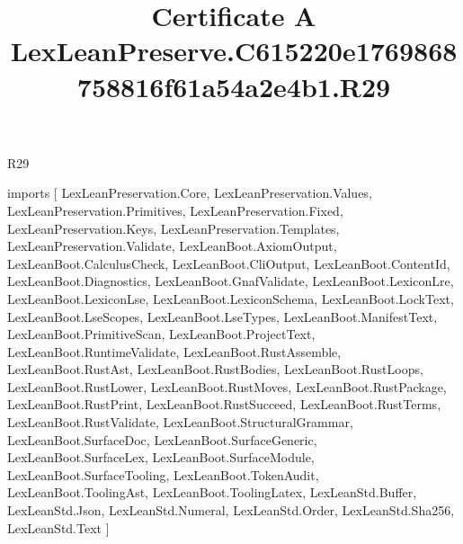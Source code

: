 \begin{lexlean}{R29}
\title{Certificate A LexLeanPreserve.C615220e1769868758816f61a54a2e4b1.R29}
\begin{coremodule}
imports [
  LexLeanPreservation.Core,
  LexLeanPreservation.Values,
  LexLeanPreservation.Primitives,
  LexLeanPreservation.Fixed,
  LexLeanPreservation.Keys,
  LexLeanPreservation.Templates,
  LexLeanPreservation.Validate,
  LexLeanBoot.AxiomOutput,
  LexLeanBoot.CalculusCheck,
  LexLeanBoot.CliOutput,
  LexLeanBoot.ContentId,
  LexLeanBoot.Diagnostics,
  LexLeanBoot.GnafValidate,
  LexLeanBoot.LexiconLre,
  LexLeanBoot.LexiconLse,
  LexLeanBoot.LexiconSchema,
  LexLeanBoot.LockText,
  LexLeanBoot.LseScopes,
  LexLeanBoot.LseTypes,
  LexLeanBoot.ManifestText,
  LexLeanBoot.PrimitiveScan,
  LexLeanBoot.ProjectText,
  LexLeanBoot.RuntimeValidate,
  LexLeanBoot.RustAssemble,
  LexLeanBoot.RustAst,
  LexLeanBoot.RustBodies,
  LexLeanBoot.RustLoops,
  LexLeanBoot.RustLower,
  LexLeanBoot.RustMoves,
  LexLeanBoot.RustPackage,
  LexLeanBoot.RustPrint,
  LexLeanBoot.RustSucceed,
  LexLeanBoot.RustTerms,
  LexLeanBoot.RustValidate,
  LexLeanBoot.StructuralGrammar,
  LexLeanBoot.SurfaceDoc,
  LexLeanBoot.SurfaceGeneric,
  LexLeanBoot.SurfaceLex,
  LexLeanBoot.SurfaceModule,
  LexLeanBoot.SurfaceTooling,
  LexLeanBoot.TokenAudit,
  LexLeanBoot.ToolingAst,
  LexLeanBoot.ToolingLatex,
  LexLeanStd.Buffer,
  LexLeanStd.Json,
  LexLeanStd.Numeral,
  LexLeanStd.Order,
  LexLeanStd.Sha256,
  LexLeanStd.Text
]


\end{coremodule}
\end{lexlean}
